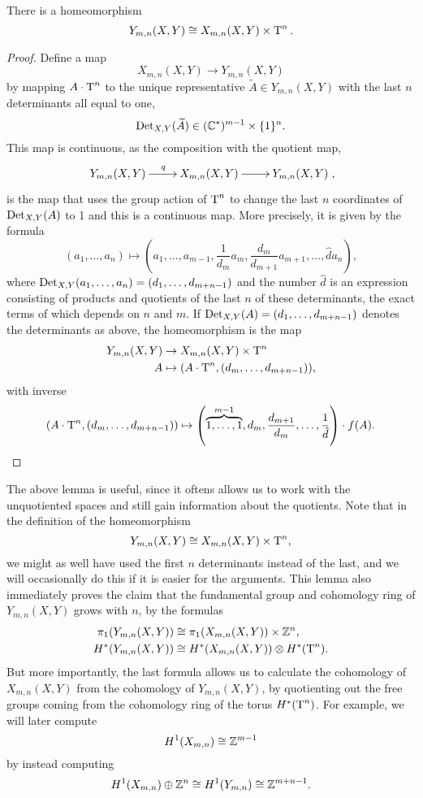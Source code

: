 \begin{lemma}
  \label{lem:reduktion}
  There is a homeomorphism
  \[ Y_{m,n}(X,Y) \cong X_{m,n}(X,Y) \times \operatorname{T}^n. \]
\end{lemma}
\begin{proof}
  Define a map
  \[ X_{m,n}(X,Y) \to Y_{m,n}(X,Y) \]
  by mapping $A\cdot \operatorname{T}^n$ to the unique representative
  $\widetilde{A} \in Y_{m,n}(X,Y)$ with the last
  $n$ determinants all equal to one,
  \[ \operatorname{Det}_{X,Y}(\widetilde{A}) \in (\mathbb{C}^*)^{m-1} \times
  \{1\}^n. \]
  This map is continuous, as the composition with the quotient map,
  \[ \xymatrix{Y_{m,n}(X,Y) \ar[r]^q & X_{m,n}(X,Y) \ar[r] &
    Y_{m,n}(X,Y)}, \]
  is the map that uses the group action of $\operatorname{T}^n$ to change the last
  $n$ coordinates of $\operatorname{Det}_{X,Y}(A)$ to 1 and this is a continuous
  map. More precisely, it is given by the formula
  \[ (a_1,\dots,a_n) \mapsto \left(a_1,\dots,a_{m-1},\frac{1}{d_m}a_m,
    \frac{d_m}{d_{m+1}} a_{m+1},\dots,\hat{d}a_n\right), \]
  where $\operatorname{Det}_{X,Y}(a_1,\dots,a_n) = (d_1,\dots,d_{m+n-1})$ and the
  number $\hat{d}$ is an expression consisting of products and
  quotients of the last $n$ of these
  determinants, the exact terms of which depends on $n$ and $m$. If
  $\operatorname{Det}_{X,Y}(A) = (d_1,\dots,d_{m+n-1})$ denotes the determinants as
  above, the homeomorphism is the map
  \begin{align*}
    Y_{m,n}(X,Y) &\to X_{m,n}(X,Y) \times \operatorname{T}^n\\
    A &\mapsto (A\cdot \operatorname{T}^n, (d_m,\dots,d_{m+n-1})),
  \end{align*}
  with inverse
  \[ (A\cdot \operatorname{T}^n, (d_m,\dots, d_{m+n-1})) \mapsto
  \left(\overbrace{1,\dots,1}^{m-1},d_m,\frac{d_{m+1}}{d_m},\dots,
    \frac{1}{\hat{d}}\right) \cdot f(A). \]
\end{proof}

The above lemma is useful, since it oftens allows us to work with the
unquotiented spaces and still gain information about the
quotients. Note that in the definition of the homeomorphism
\[ Y_{m,n}(X,Y) \cong X_{m,n}(X,Y) \times \operatorname{T}^n , \]
 we might as well have
used the first $n$ determinants instead of the last, and we will
occasionally do this if it is easier for the arguments. 
This lemma also immediately proves the claim that the fundamental
group and cohomology ring of $Y_{m,n}(X,Y)$ grows with $n$, by the
formulas
\begin{align*}
  \pi_1(Y_{m,n}(X,Y)) &\cong \pi_1(X_{m,n}(X,Y)) \times \mathbb{Z}^n, \\
  H^*(Y_{m,n}(X,Y)) &\cong H^*(X_{m,n}(X,Y)) \otimes H^*(\operatorname{T}^n).
\end{align*}
But more importantly, the last formula allows us to calculate the
cohomology of $X_{m,n}(X,Y)$ from the cohomology of $Y_{m,n}(X,Y)$, by
quotienting out the free groups coming from the cohomology ring of the
torus $H^*(\operatorname{T}^n)$. For example, we will later compute 
\[ H^1(X_{m,n}) \cong \mathbb{Z}^{m-1} \]
by instead computing
\[ H^1(X_{m,n}) \oplus \mathbb{Z}^n \cong H^1(Y_{m,n}) \cong \mathbb{Z}^{m+n-1}. \]

